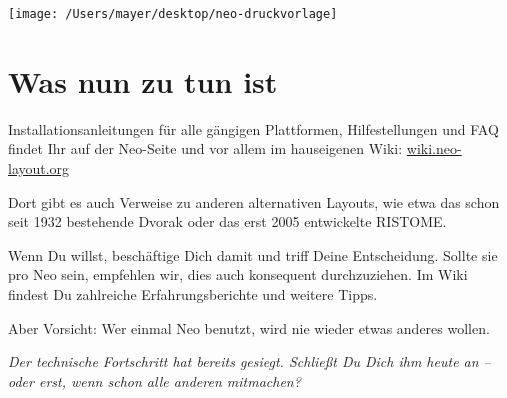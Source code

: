 \documentclass[%
  a4paper
  ,ngerman
  ,notumble
]{leaflet}
\begin{document}
\hfill

\hspace*{2em}%
\texttt{[image: /Users/mayer/desktop/neo-druckvorlage]}

\section{Was nun zu tun ist}
Installationsanleitungen für alle gängigen Plattformen, Hilfestellungen und FAQ findet Ihr auf der Neo-Seite und vor allem im hauseigenen Wiki: \url{wiki.neo-layout.org} 

Dort gibt es auch Verweise zu anderen alternativen Layouts, wie etwa das schon seit 1932 bestehende Dvorak oder das erst 2005 entwickelte RISTOME. 

Wenn Du willst, beschäftige Dich damit und triff Deine Entscheidung. Sollte sie pro Neo sein, empfehlen wir, dies auch konsequent durchzuziehen. Im Wiki findest Du zahlreiche Erfahrungsberichte und weitere Tipps.

Aber Vorsicht: Wer einmal Neo benutzt, wird nie wieder etwas anderes wollen.

\vspace{12.5em}
\emph{Der technische Fortschritt hat bereits gesiegt. Schließt Du Dich ihm heute an – oder erst, wenn schon alle anderen mitmachen?}

\newpage

\blindtext[6]
\end{document}

